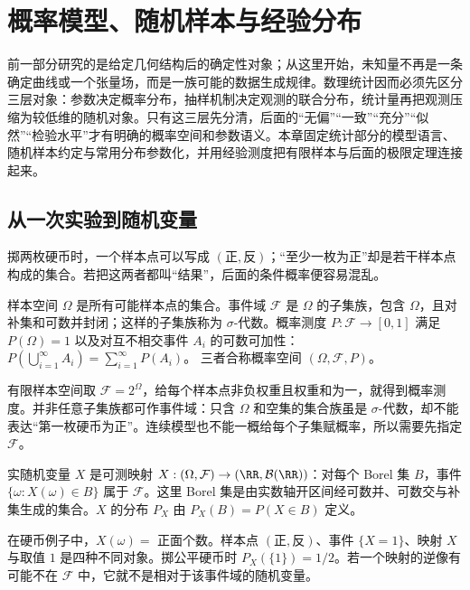 \chapter{概率模型、随机样本与经验分布}\label{chap:math-stat-models} \label{chap:math-probability}

前一部分研究的是给定几何结构后的确定性对象；从这里开始，未知量不再是一条确定曲线或一个张量场，而是一族可能的数据生成规律。数理统计因而必须先区分三层对象：参数决定概率分布，抽样机制决定观测的联合分布，统计量再把观测压缩为较低维的随机对象。只有这三层先分清，后面的“无偏”“一致”“充分”“似然”“检验水平”才有明确的概率空间和参数语义。本章固定统计部分的模型语言、随机样本约定与常用分布参数化，并用经验测度把有限样本与后面的极限定理连接起来。

\section{从一次实验到随机变量}

掷两枚硬币时，一个样本点可以写成 \((\text{正},\text{反})\)；“至少一枚为正”却是若干样本点构成的集合。若把这两者都叫“结果”，后面的条件概率便容易混乱。

\begin{definition}[概率空间]
样本空间 \(\Omega\) 是所有可能样本点的集合。事件域 \(\mathcal F\) 是 \(\Omega\) 的子集族，包含 \(\Omega\)，且对补集和可数并封闭；这样的子集族称为 \(\sigma\)-代数。概率测度 \(P:\mathcal F\to[0,1]\) 满足 \(P(\Omega)=1\) 以及对互不相交事件 \(A_i\) 的可数可加性：
\(P(\bigcup_{i=1}^\infty A_i)=\sum_{i=1}^\infty P(A_i)\)。
三者合称概率空间 \((\Omega,\mathcal F,P)\)。
\end{definition}

有限样本空间取 \(\mathcal F=2^\Omega\)，给每个样本点非负权重且权重和为一，就得到概率测度。并非任意子集族都可作事件域：只含 \(\Omega\) 和空集的集合族虽是 \(\sigma\)-代数，却不能表达“第一枚硬币为正”。连续模型也不能一概给每个子集赋概率，所以需要先指定 \(\mathcal F\)。

\begin{definition}[随机变量及其分布]
实随机变量 \(X\) 是可测映射 \(X:(\Omega,\mathcal F)\to(\RR,\mathcal B(\RR))\)：对每个 Borel 集 \(B\)，事件 \(\{\omega:X(\omega)\in B\}\) 属于 \(\mathcal F\)。这里 Borel 集是由实数轴开区间经可数并、可数交与补集生成的集合。\(X\) 的分布 \(P_X\) 由 \(P_X(B)=P(X\in B)\) 定义。
\end{definition}

在硬币例子中，\(X(\omega)=\) 正面个数。样本点 \((\text{正},\text{反})\)、事件 \(\{X=1\}\)、映射 \(X\) 与取值 \(1\) 是四种不同对象。掷公平硬币时 \(P_X(\{1\})=1/2\)。若一个映射的逆像有可能不在 \(\mathcal F\) 中，它就不是相对于该事件域的随机变量。

